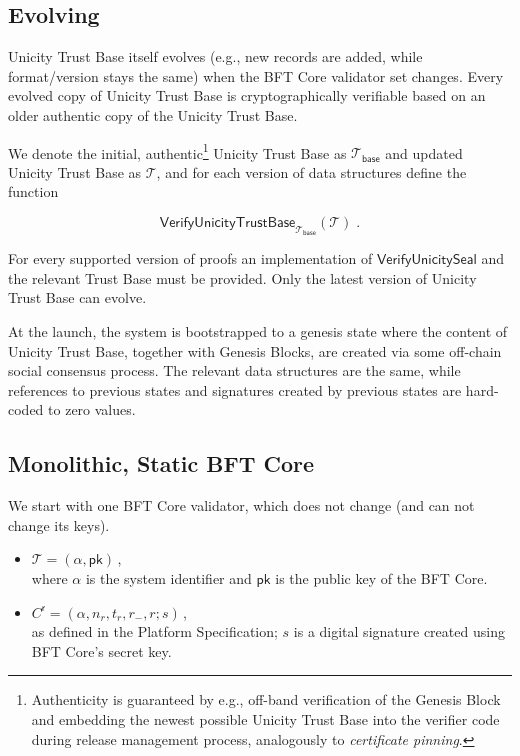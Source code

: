 \subsection{Evolving}

Unicity Trust Base itself evolves (e.g., new records are added, while format/version stays the same) when the BFT Core validator set changes. Every evolved copy of Unicity Trust Base is cryptographically verifiable based on an older authentic copy of the Unicity Trust Base.

We denote the initial, authentic\footnote{Authenticity is guaranteed by e.g., off-band verification of the Genesis Block and embedding the newest possible Unicity Trust Base into the verifier code during release management process, analogously to \emph{certificate pinning}.} Unicity Trust Base as $\mathcal{T}_\mathsf{base}$ and updated Unicity Trust Base as $\mathcal{T}$, and for each version of data structures define the function

\[ \mathsf{VerifyUnicityTrustBase}_{\mathcal{T}_\mathsf{base}}(\mathcal{T})  \; .
  \]

For every supported version of proofs an implementation of $\mathsf{VerifyUnicitySeal}$ and the relevant Trust Base must be provided. Only the latest version of Unicity Trust Base can evolve.

At the launch, the system is bootstrapped to a genesis state where the content of Unicity Trust Base, together with Genesis Blocks, are created via some off-chain social consensus process. The relevant data structures are the same, while references to previous states and signatures created by previous states are hard-coded to zero values.


\subsection{Monolithic, Static BFT Core}

We start with one BFT Core validator, which does not change (and can not change its keys).

\begin{itemize}
  \item $\mathcal{T} = (\alpha, \mathsf{pk})$\,, \\
  where $\alpha$ is the system identifier and $\mathsf{pk}$ is the public key of the BFT Core.
  \item $C^\mathsf{r} = (\alpha, n_r, t_r, r_-, r; s)$\,, \\
  as defined in the Platform Specification; $s$ is a digital signature created using BFT Core's secret key.
\end{itemize}


